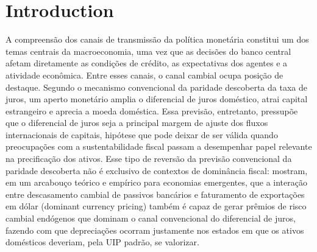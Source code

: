 \documentclass[preprint,authoryear,review,12pt]{elsarticle}
\begin{document}
\section{Introduction}
A compreensão dos canais de transmissão da política monetária constitui um dos temas centrais da macroeconomia, uma vez que as decisões do banco central afetam diretamente as condições de crédito, as expectativas dos agentes e a atividade econômica. Entre esses canais, o canal cambial ocupa posição de destaque. Segundo o mecanismo convencional da paridade descoberta da taxa de juros, um aperto monetário amplia o diferencial de juros doméstico, atrai capital estrangeiro e aprecia a moeda doméstica. Essa previsão, entretanto, pressupõe que o diferencial de juros seja a principal margem de ajuste dos fluxos internacionais de capitais, hipótese que pode deixar de ser válida quando preocupações com a sustentabilidade fiscal passam a desempenhar papel relevante na precificação dos ativos. Esse tipo de reversão da previsão convencional da paridade descoberta não é exclusivo de contextos de dominância fiscal: \cite{dalgicozhan2026} mostram, em um arcabouço teórico e empírico para economias emergentes, que a interação entre descasamento cambial de passivos bancários e faturamento de exportações em dólar (dominant currency pricing) também é capaz de gerar prêmios de risco cambial endógenos que dominam o canal convencional do diferencial de juros, fazendo com que depreciações ocorram justamente nos estados em que os ativos domésticos deveriam, pela UIP padrão, se valorizar.

\end{document}
